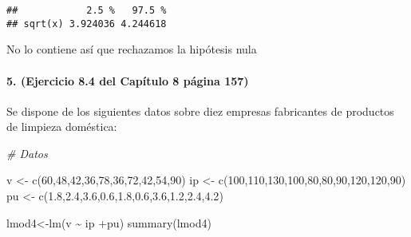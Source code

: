\documentclass[
]{article}
\newenvironment{Shaded}{\begin{snugshade}}{\end{snugshade}}
\newcommand{\CommentTok}[1]{\textcolor[rgb]{0.56,0.35,0.01}{\textit{#1}}}
\newcommand{\DecValTok}[1]{\textcolor[rgb]{0.00,0.00,0.81}{#1}}
\newcommand{\FloatTok}[1]{\textcolor[rgb]{0.00,0.00,0.81}{#1}}
\newcommand{\FunctionTok}[1]{\textcolor[rgb]{0.00,0.00,0.00}{#1}}
\newcommand{\NormalTok}[1]{#1}
\newcommand{\OtherTok}[1]{\textcolor[rgb]{0.56,0.35,0.01}{#1}}
\newcommand{\SpecialCharTok}[1]{\textcolor[rgb]{0.00,0.00,0.00}{#1}}
\begin{document}
\begin{verbatim}
##            2.5 %   97.5 %
## sqrt(x) 3.924036 4.244618
\end{verbatim}

No lo contiene así que rechazamos la hipótesis nula

\hypertarget{ejercicio-8.4-del-capuxedtulo-8-puxe1gina-157}{%
\paragraph{5. (Ejercicio 8.4 del Capítulo 8 página
157)}\label{ejercicio-8.4-del-capuxedtulo-8-puxe1gina-157}}

Se dispone de los siguientes datos sobre diez empresas fabricantes de
productos de limpieza doméstica:

\begin{Shaded}
\begin{Highlighting}[]
\CommentTok{\# Datos}

\NormalTok{v }\OtherTok{\textless{}{-}} \FunctionTok{c}\NormalTok{(}\DecValTok{60}\NormalTok{,}\DecValTok{48}\NormalTok{,}\DecValTok{42}\NormalTok{,}\DecValTok{36}\NormalTok{,}\DecValTok{78}\NormalTok{,}\DecValTok{36}\NormalTok{,}\DecValTok{72}\NormalTok{,}\DecValTok{42}\NormalTok{,}\DecValTok{54}\NormalTok{,}\DecValTok{90}\NormalTok{)}
\NormalTok{ip }\OtherTok{\textless{}{-}} \FunctionTok{c}\NormalTok{(}\DecValTok{100}\NormalTok{,}\DecValTok{110}\NormalTok{,}\DecValTok{130}\NormalTok{,}\DecValTok{100}\NormalTok{,}\DecValTok{80}\NormalTok{,}\DecValTok{80}\NormalTok{,}\DecValTok{90}\NormalTok{,}\DecValTok{120}\NormalTok{,}\DecValTok{120}\NormalTok{,}\DecValTok{90}\NormalTok{)}
\NormalTok{pu }\OtherTok{\textless{}{-}} \FunctionTok{c}\NormalTok{(}\FloatTok{1.8}\NormalTok{,}\FloatTok{2.4}\NormalTok{,}\FloatTok{3.6}\NormalTok{,}\FloatTok{0.6}\NormalTok{,}\FloatTok{1.8}\NormalTok{,}\FloatTok{0.6}\NormalTok{,}\FloatTok{3.6}\NormalTok{,}\FloatTok{1.2}\NormalTok{,}\FloatTok{2.4}\NormalTok{,}\FloatTok{4.2}\NormalTok{)}
\end{Highlighting}
\end{Shaded}

\begin{Shaded}
\begin{Highlighting}[]
\NormalTok{lmod4}\OtherTok{\textless{}{-}}\FunctionTok{lm}\NormalTok{(v }\SpecialCharTok{\textasciitilde{}}\NormalTok{ ip }\SpecialCharTok{+}\NormalTok{pu)}
\FunctionTok{summary}\NormalTok{(lmod4)}
\end{Highlighting}
\end{Shaded}
\end{document}
